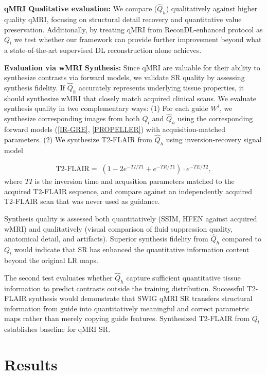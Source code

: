 \documentclass[journal,twoside,web]{ieeecolor}
\begin{document}
\textbf{qMRI Qualitative evaluation:} We compare ($\hat{Q}_h$) qualitatively against higher quality qMRI, focusing on structural detail recovery and quantitative value preservation. Additionally, by treating qMRI from ReconDL-enhanced protocol as  $Q_l$  we test whether our framework can provide further improvement beyond what a state-of-the-art supervised DL reconstruction alone achieves.

\textbf{Evaluation via wMRI Synthesis:} Since qMRI are valuable for their ability to synthesize contrasts via forward models, we validate SR quality by assessing synthesis fidelity. If $\hat{Q}_h$ accurately represents underlying tissue properties, it should synthesize wMRI that closely match acquired clinical scans. We evaluate synthesis quality in two complementary ways: (1) For each guide $W^i$, we synthesize corresponding images from both $Q_l$ and $\hat{Q}_h$ using the corresponding forward models (\eqref{IR-GRE}, \eqref{PROPELLER}) with acquisition-matched parameters. (2) We synthesize T2-FLAIR from $\hat{Q}_h$  using inversion-recovery signal model

\begin{align}
\text{T2-FLAIR} =\; 
     \left(1 - 2e^{-TI / T1} + e^{-TR / T1} \right)\cdot e^{-TE / T2} ,
    \label{T2-FLAIR-signal-equation}
\end{align}
where $TI$ is the inversion time and acqusition parameters matched to the acquired T2-FLAIR sequence, and compare against an independently acquired T2-FLAIR scan that was never used as guidance.

Synthesis quality is assessed both quantitatively (SSIM, HFEN against acquired wMRI) and qualitatively (visual comparison of fluid suppression quality, anatomical detail, and artifacts). Superior synthesis fidelity from $\hat{Q}_h$ compared to $Q_l$ would indicate that SR has enhanced the quantitative information content beyond the original LR maps.


The second test evaluates whether $\hat{Q}_h$ capture sufficient quantitative tissue information to predict contrasts outside the training distribution. Successful T2-FLAIR synthesis would demonstrate that SWIG qMRI SR transfers structural information from guide into quantitatively meaningful and correct parametric maps rather than merely copying guide features. Synthesized T2-FLAIR from $Q_l$ establishes baseline for qMRI SR.

\section{Results} %
\end{document}
